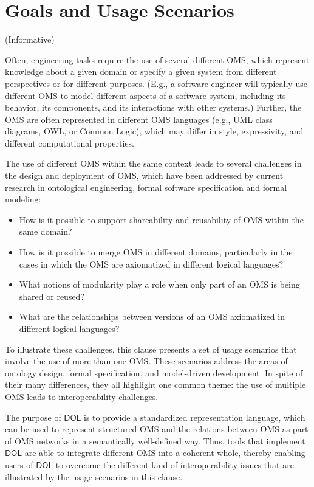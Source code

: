 \documentclass[10pt,fleqn,final]{scrreprt}
\newcommand*{\DOL}{\ensuremath{\mathsf{DOL}}\xspace}
\newcommand{\informative}[0]{{\begin{center}{\Large{(Informative})}\end{center}} \bigskip}
\newcommand{\clauseI}[1]{\chapter{#1} \informative }
\newenvironment{definitions}[0]{\medskip }{}
\begin{document}
\begin{definitions}

\clauseI{Goals and Usage Scenarios} \label{c:goal}


Often, engineering tasks require the use of several different OMS, which represent knowledge about 
a given domain or specify a given system from different perspectives or for different purposes.
(E.g., a software engineer will typically use different OMS to model different aspects of a software
 system,  including its behavior, its components, and its interactions with other systems.)  Further, the OMS are often represented in different OMS languages (e.g., UML class diagrams, OWL, or Common Logic), which may differ in style, expressivity, and different computational properties. 

The use of different OMS within the same context leads to  several 
challenges in the design and deployment of OMS, which have been addressed by current research in 
ontological engineering, formal software specification and formal modeling:
\begin{itemize}
\item How is it possible to support shareability and reusability of OMS within the same domain?
\item How is it possible to merge OMS in different domains, particularly in the cases 
in which the OMS are axiomatized in different logical languages?
\item What notions of modularity play a role when only part of an OMS is being shared or reused?
\item What are the relationships between versions of an OMS axiomatized in different logical languages?
\end{itemize}


To illustrate these challenges, this clause presents a set of usage scenarios that involve the use of more than one OMS. These scenarios address the areas of ontology design, formal specification, and model-driven development. In spite of their many differences, they  all highlight one common theme:  
 the use of multiple OMS leads to interoperability challenges. 


The purpose of \DOL is to provide  a
standardized representation language, which can be used to represent structured OMS and the relations 
between OMS as part of OMS networks in a semantically well-defined way. Thus, tools that implement \DOL are able to integrate different OMS into a coherent whole, thereby enabling users of \DOL to overcome the different kind of interoperability issues that are illustrated by the usage scenarios in this clause.  



\end{definitions}
\end{document}
